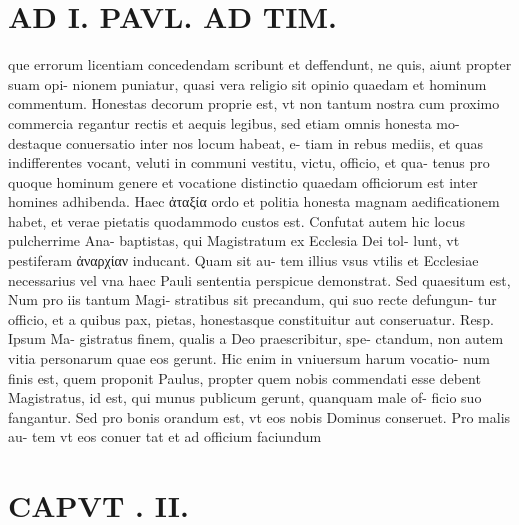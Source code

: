 \documentclass{article}
\begin{document}
\begin{pages}
\section*{AD I. PAVL. AD TIM. }
\marginpar{[ p.50 ]}\pstart que errorum licentiam concedendam scribunt et deffendunt, ne quis, aiunt propter suam opi- nionem puniatur, quasi vera religio sit opinio quaedam et hominum commentum. Honestas decorum proprie est, vt non tantum nostra cum proximo commercia regantur rectis et aequis legibus, sed etiam omnis honesta mo- destaque conuersatio inter nos locum habeat, e- tiam in rebus mediis, et quas indifferentes vocant, veluti in communi vestitu, victu, officio, et qua- tenus pro quoque hominum genere et vocatione distinctio quaedam officiorum est inter homines adhibenda. Haec ἀταξία ordo et politia honesta magnam aedificationem habet, et verae pietatis quodammodo custos est. Confutat autem hic locus pulcherrime Ana- baptistas, qui Magistratum ex Ecclesia Dei tol- lunt, vt pestiferam ἀναρχίαν inducant. Quam sit au- tem illius vsus vtilis et Ecclesiae necessarius vel vna haec Pauli sententia perspicue demonstrat. Sed quaesitum est, Num pro iis tantum Magi- stratibus sit precandum, qui suo recte defungun- tur officio, et a quibus pax, pietas, honestasque constituitur aut conseruatur. Resp. Ipsum Ma- gistratus finem, qualis a Deo praescribitur, spe- ctandum, non autem vitia personarum quae eos gerunt. Hic enim in vniuersum harum vocatio- num finis est, quem proponit Paulus, propter quem nobis commendati esse debent Magistratus, id est, qui munus publicum gerunt, quanquam male of- ficio suo fangantur. Sed pro bonis orandum est, vt eos nobis Dominus conseruet. Pro malis au- tem vt eos conuer tat et ad officium faciundum  \pend
\section*{CAPVT . II. }
\marginpar{[ p.51 ]}\pstart {}
{}

\end{pages}
\end{document}
